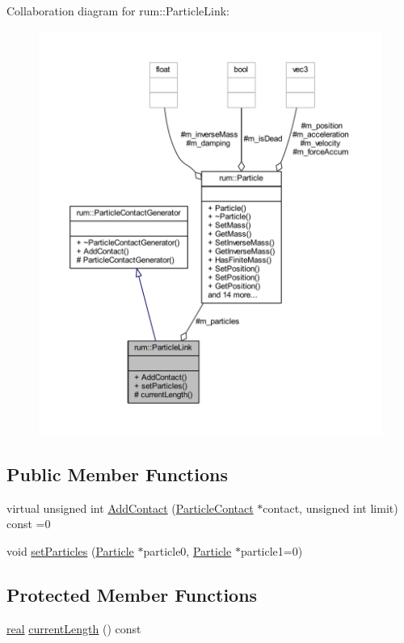 Collaboration diagram for rum\+:\+:Particle\+Link\+:\nopagebreak
\begin{figure}[H]
\begin{center}
\leavevmode
\includegraphics[width=350pt]{classrum_1_1_particle_link__coll__graph}
\end{center}
\end{figure}
\subsection*{Public Member Functions}
\begin{DoxyCompactItemize}
\item 
virtual unsigned int \hyperlink{classrum_1_1_particle_link_a86e7dbac23cd26fce627bf5ed1fae6f5}{Add\+Contact} (\hyperlink{classrum_1_1_particle_contact}{Particle\+Contact} $\ast$contact, unsigned int limit) const =0
\item 
void \hyperlink{classrum_1_1_particle_link_a87021898f5a8ec8f5764c747c8117544}{set\+Particles} (\hyperlink{classrum_1_1_particle}{Particle} $\ast$particle0, \hyperlink{classrum_1_1_particle}{Particle} $\ast$particle1=0)
\end{DoxyCompactItemize}
\subsection*{Protected Member Functions}
\begin{DoxyCompactItemize}
\item 
\hyperlink{namespacerum_a7e8cca23573d5eaead0f138cbaa4862c}{real} \hyperlink{classrum_1_1_particle_link_ad77a03be98566b0913aad0882e2283ac}{current\+Length} () const
\end{DoxyCompactItemize}
